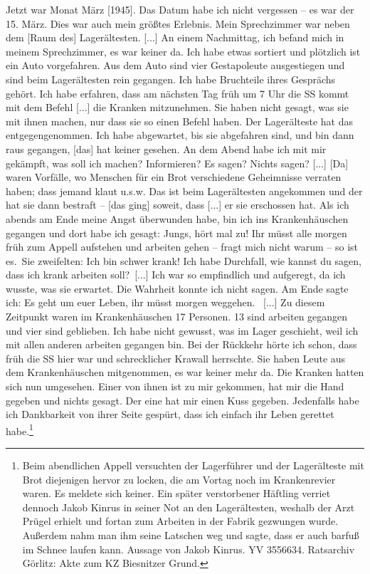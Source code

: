 \label{widerstand_kinrus}
\begin{leftbar}
Jetzt war Monat März [1945]. Das Datum habe ich nicht vergessen -- es war der 15. März. Dies war auch mein größtes Erlebnis. \newline
Mein Sprechzimmer war neben dem [Raum des] Lagerältesten. [...] An einem Nachmittag, ich befand mich in meinem Sprechzimmer, es war keiner da. Ich habe etwas sortiert und plötzlich ist ein Auto vorgefahren. Aus dem Auto sind vier Gestapoleute ausgestiegen und sind beim Lager\-ältesten rein gegangen. Ich habe Bruchteile ihres Gesprächs gehört. Ich habe erfahren, dass am nächsten Tag früh um 7 Uhr die SS kommt mit dem Befehl [...] die Kranken mitzunehmen. Sie haben nicht gesagt, was sie mit ihnen machen, nur dass sie so einen Befehl haben. Der Lager\-älteste hat das entgegengenommen. Ich habe abgewartet, bis sie abgefahren sind, und bin dann raus gegangen, [das] hat keiner gesehen. An dem Abend habe ich mit mir gekämpft, was soll ich machen? Informieren? Es sagen? Nichts sagen? [...] [Da] waren Vorfälle, wo Menschen für ein Brot verschiedene Geheimnisse verraten haben; dass jemand klaut u.s.w. Das ist beim Lager\-ältesten angekommen und der hat sie dann bestraft -- [das ging] soweit, dass [...] er sie erschossen hat. Als ich abends am Ende meine Angst überwunden habe, bin ich ins Krankenhäuschen gegangen und dort habe ich gesagt: \glqq Jungs, hört mal zu! Ihr müsst alle morgen früh zum Appell aufstehen und arbeiten gehen -- fragt mich nicht warum -- so ist es.\grqq~Sie zweifelten: \glqq Ich bin schwer krank! Ich habe Durchfall, wie kannst du sagen, dass ich krank arbeiten soll?\grqq~[...] Ich war so empfindlich und aufgeregt, da ich wusste, was sie erwartet. Die Wahrheit konnte ich nicht sagen. Am Ende sagte ich: \glqq Es geht um euer Leben, ihr müsst morgen weggehen.\grqq~
[...] Zu diesem Zeitpunkt waren im Krankenhäuschen 17 Personen. 13 sind arbeiten gegangen und vier sind geblieben. Ich habe nicht gewusst, was im Lager geschieht, weil ich mit allen anderen arbeiten gegangen bin. Bei der Rückkehr hörte ich schon, dass früh die SS hier war und schrecklicher Krawall herrschte. Sie haben Leute aus dem Krankenhäuschen mitgenommen, es war keiner mehr da. Die Kranken hatten sich nun umgesehen. Einer von ihnen ist zu mir gekommen, hat mir die Hand gegeben und nichts gesagt. Der eine hat mir einen Kuss gegeben. Jedenfalls habe ich Dankbarkeit von ihrer Seite gespürt, dass ich einfach ihr Leben gerettet habe.\footnote{Beim abendlichen Appell versuchten der Lager\-führer und der Lager\-älteste mit Brot diejenigen hervor zu locken, die am Vortag noch im Krankenrevier waren. Es meldete sich keiner. Ein später verstorbener Häftling verriet dennoch Jakob Kinrus in seiner Not an den Lager\-ältesten, weshalb der Arzt Prügel erhielt und fortan zum Arbeiten in der Fabrik gezwungen wurde. Außerdem nahm man ihm seine Latschen weg und sagte, dass er auch barfuß im Schnee laufen kann. Aussage von Jakob Kinrus. YV 3556634. Ratsarchiv Görlitz: Akte zum KZ Biesnitzer Grund.}
\end{leftbar}

